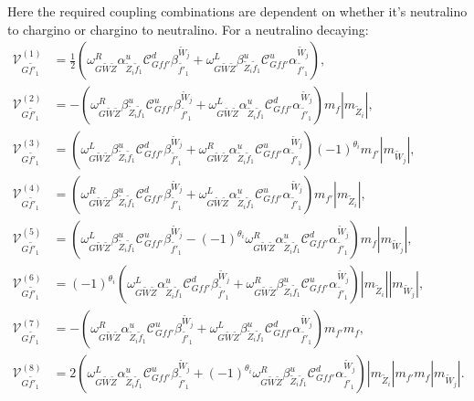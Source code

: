 \documentclass[final,3p,times,pdflatex]{elsarticle}
\begin{document}
Here the required coupling combinations are dependent on whether it's
neutralino to chargino or chargino to neutralino. For a neutralino decaying:
\begin{align}
\mathcal{V}_{G \tilde{f'}_1}^{(1)} &= \frac{1}{2}(\omega_{G \tilde{W} \tilde{Z}}^R   \alpha_{\tilde{Z}_i \tilde{f}_1}^{u}  \mathcal{C}_{G f f'}^d  \beta_{\tilde{f'}_1}^{\tilde{W}_j} +  \omega_{G \tilde{W} \tilde{Z}}^L  \beta_{\tilde{Z}_i \tilde{f}_1}^{u}  \mathcal{C}_{G f f'}^u  \alpha_{\tilde{f'}_1}^{\tilde{W}_j}), \\
\mathcal{V}_{G \tilde{f'}_1}^{(2)} &= -(\omega_{G \tilde{W} \tilde{Z}}^R   \beta_{\tilde{Z}_i \tilde{f}_1}^{u}  \mathcal{C}_{G f f'}^u  \beta_{\tilde{f'}_1}^{\tilde{W}_j} +  \omega_{G \tilde{W} \tilde{Z}}^L  \alpha_{\tilde{Z}_i \tilde{f}_1}^{u}  \mathcal{C}_{G f f'}^d  \alpha_{\tilde{f'}_1}^{\tilde{W}_j})m_{f}|m_{\tilde{Z}_i}|, \\
\mathcal{V}_{G \tilde{f'}_1}^{(3)} &= (\omega_{G \tilde{W} \tilde{Z}}^L  \beta_{\tilde{Z}_i \tilde{f}_1}^{u}  \mathcal{C}_{G f f'}^d  \beta_{\tilde{f'}_1}^{\tilde{W}_j} +  \omega_{G \tilde{W} \tilde{Z}}^R  \alpha_{\tilde{Z}_i \tilde{f}_1}^{u}  \mathcal{C}_{G f f'}^u  \alpha_{\tilde{f'}_1}^{\tilde{W}_j})(-1)^{\theta_i} m_{f'}|m_{\tilde{W}_j}|, \\
\mathcal{V}_{G \tilde{f'}_1}^{(4)} &= (\omega_{G \tilde{W} \tilde{Z}}^R   \beta_{\tilde{Z}_i \tilde{f}_1}^{u}  \mathcal{C}_{G f f'}^d  \beta_{\tilde{f'}_1}^{\tilde{W}_j} +  \omega_{G \tilde{W} \tilde{Z}}^L  \alpha_{\tilde{Z}_i \tilde{f}_1}^{u}  \mathcal{C}_{G f f'}^u  \alpha_{\tilde{f'}_1}^{\tilde{W}_j})m_{f'}|m_{\tilde{Z}_i}|, \\
\mathcal{V}_{G \tilde{f'}_1}^{(5)} &= (\omega_{G \tilde{W} \tilde{Z}}^L \beta_{\tilde{Z}_i \tilde{f}_1}^{u}  \mathcal{C}_{G f f'}^u  \beta_{\tilde{f'}_1}^{\tilde{W}_j} -  (-1)^{\theta_i} \omega_{G \tilde{W} \tilde{Z}}^R  \alpha_{\tilde{Z}_i \tilde{f}_1}^{u}  \mathcal{C}_{G f f'}^d  \alpha_{\tilde{f'}_1}^{\tilde{W}_j})m_{f} |m_{\tilde{W}_j}|,\\
\mathcal{V}_{G \tilde{f'}_1}^{(6)} &= (-1)^{\theta_i}(\omega_{G \tilde{W} \tilde{Z}}^L   \alpha_{\tilde{Z}_i \tilde{f}_1}^{u}  \mathcal{C}_{G f f'}^d  \beta_{\tilde{f'}_1}^{\tilde{W}_j} + \omega_{G \tilde{W} \tilde{Z}}^R  \beta_{\tilde{Z}_i \tilde{f}_1}^{u}  \mathcal{C}_{G f f'}^u  \alpha_{\tilde{f'}_1}^{\tilde{W}_j})|m_{\tilde{Z}_i}||m_{\tilde{W}_j}| ,\\
\mathcal{V}_{G \tilde{f'}_1}^{(7)} &= -(\omega_{G \tilde{W} \tilde{Z}}^R   \alpha_{\tilde{Z}_i \tilde{f}_1}^{u}  \mathcal{C}_{G f f'}^u  \beta_{\tilde{f'}_1}^{\tilde{W}_j} +  \omega_{G \tilde{W} \tilde{Z}}^L  \beta_{\tilde{Z}_i \tilde{f}_1}^{u}  \mathcal{C}_{G f f'}^d  \alpha_{\tilde{f'}_1}^{\tilde{W}_j})m_{f'}m_{f}, \\
\mathcal{V}_{G \tilde{f'}_1}^{(8)} &= 2(\omega_{G \tilde{W} \tilde{Z}}^L   \alpha_{\tilde{Z}_i \tilde{f}_1}^{u}  \mathcal{C}_{G f f'}^u  \beta_{\tilde{f'}_1}^{\tilde{W}_j} + (-1)^{\theta_i}\omega_{G \tilde{W} \tilde{Z}}^R  \beta_{\tilde{Z}_i \tilde{f}_1}^{u}  \mathcal{C}_{G f f'}^d  \alpha_{\tilde{f'}_1}^{\tilde{W}_j})|m_{\tilde{Z}_i}|m_{f'}m_{f}|m_{\tilde{W}_j}|.
\end{align}
\end{document}
